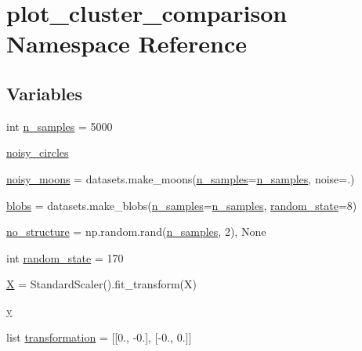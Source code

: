 \hypertarget{namespaceplot__cluster__comparison}{}\section{plot\+\_\+cluster\+\_\+comparison Namespace Reference}
\label{namespaceplot__cluster__comparison}
\subsection*{Variables}
\begin{DoxyCompactItemize}
\item 
int \hyperlink{namespaceplot__cluster__comparison_a2e68edd1586a01f4249bfe2cf368074b}{n\+\_\+samples} = 5000
\item 
\hyperlink{namespaceplot__cluster__comparison_a9b713de1bdebe0642df392b2a7dff7f3}{noisy\+\_\+circles}
\item 
\hyperlink{namespaceplot__cluster__comparison_a90ab3d67916d16226f58ffe7c50d7623}{noisy\+\_\+moons} = datasets.\+make\+\_\+moons(\hyperlink{namespaceplot__cluster__comparison_a2e68edd1586a01f4249bfe2cf368074b}{n\+\_\+samples}=\hyperlink{namespaceplot__cluster__comparison_a2e68edd1586a01f4249bfe2cf368074b}{n\+\_\+samples}, noise=.)
\item 
\hyperlink{namespaceplot__cluster__comparison_a62169452e335cd67768b8071d3896818}{blobs} = datasets.\+make\+\_\+blobs(\hyperlink{namespaceplot__cluster__comparison_a2e68edd1586a01f4249bfe2cf368074b}{n\+\_\+samples}=\hyperlink{namespaceplot__cluster__comparison_a2e68edd1586a01f4249bfe2cf368074b}{n\+\_\+samples}, \hyperlink{namespaceplot__cluster__comparison_a2bfa08a7ae46422d5c6e34d5a0edd76c}{random\+\_\+state}=8)
\item 
\hyperlink{namespaceplot__cluster__comparison_a1721edbba5df230e9319d1a202b424ed}{no\+\_\+structure} = np.\+random.\+rand(\hyperlink{namespaceplot__cluster__comparison_a2e68edd1586a01f4249bfe2cf368074b}{n\+\_\+samples}, 2), None
\item 
int \hyperlink{namespaceplot__cluster__comparison_a2bfa08a7ae46422d5c6e34d5a0edd76c}{random\+\_\+state} = 170
\item 
\hyperlink{namespaceplot__cluster__comparison_a92f18e1b0bff540575ef5295ce60adef}{X} = Standard\+Scaler().fit\+\_\+transform(X)
\item 
\hyperlink{namespaceplot__cluster__comparison_a4341eac9f6e009470760b4e123c2acad}{y}
\item 
list \hyperlink{namespaceplot__cluster__comparison_accd21aa8de30bfc3ba79b3a384a05a6e}{transformation} = \mbox{[}\mbox{[}0., -\/0.\mbox{]}, \mbox{[}-\/0., 0.\mbox{]}\mbox{]}

\end{DoxyCompactItemize}
